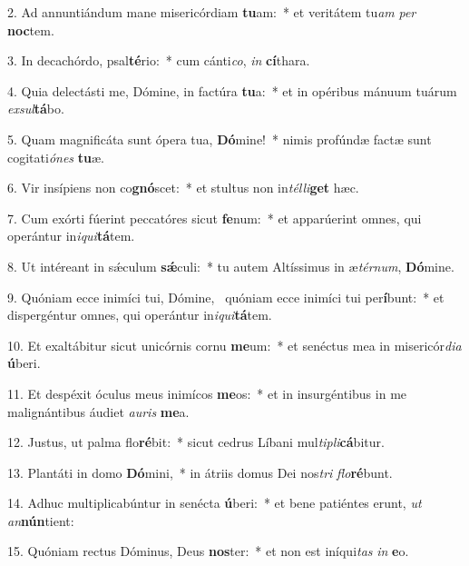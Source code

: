 2. Ad annuntiándum mane misericórdiam \textbf{tu}am:~*  et veritátem tu\textit{am} \textit{per} \textbf{noc}tem.\

3. In decachórdo, psal\textbf{té}rio:~*  cum cánti\textit{co}, \textit{in} \textbf{cí}thara.\

4. Quia delectásti me, Dómine, in factúra \textbf{tu}a:~*  et in opéribus mánuum tuárum \textit{ex}\textit{sul}\textbf{tá}bo.\

5. Quam magnificáta sunt ópera tua, \textbf{Dó}mine!~*  nimis profúndæ factæ sunt cogitati\textit{ó}\textit{nes} \textbf{tu}æ.\

6. Vir insípiens non co\textbf{gnó}scet:~*  et stultus non in\textit{tél}\textit{li}\textbf{get} hæc.\

7. Cum exórti fúerint peccatóres sicut \textbf{fe}num:~*  et apparúerint omnes, qui operántur in\textit{i}\textit{qui}\textbf{tá}tem.\

8. Ut intéreant in sǽculum \textbf{sǽ}culi:~*  tu autem Altíssimus in æ\textit{tér}\textit{num}, \textbf{Dó}mine.\

9. Quóniam ecce inimíci tui, Dómine, \dag\  quóniam ecce inimíci tui per\textbf{í}bunt:~*  et dispergéntur omnes, qui operántur in\textit{i}\textit{qui}\textbf{tá}tem.\

10. Et exaltábitur sicut unicórnis cornu \textbf{me}um:~*  et senéctus mea in misericór\textit{di}\textit{a} \textbf{ú}beri.\

11. Et despéxit óculus meus inimícos \textbf{me}os:~*  et in insurgéntibus in me malignántibus áudiet \textit{au}\textit{ris} \textbf{me}a.\

12. Justus, ut palma flo\textbf{ré}bit:~*  sicut cedrus Líbani mul\textit{ti}\textit{pli}\textbf{cá}bitur.\

13. Plantáti in domo \textbf{Dó}mini,~*  in átriis domus Dei nos\textit{tri} \textit{flo}\textbf{ré}bunt.\

14. Adhuc multiplicabúntur in senécta \textbf{ú}beri:~*  et bene patiéntes erunt, \textit{ut} \textit{an}\textbf{nún}tient:\

15. Quóniam rectus Dóminus, Deus \textbf{nos}ter:~*  et non est iníqui\textit{tas} \textit{in} \textbf{e}o.\

